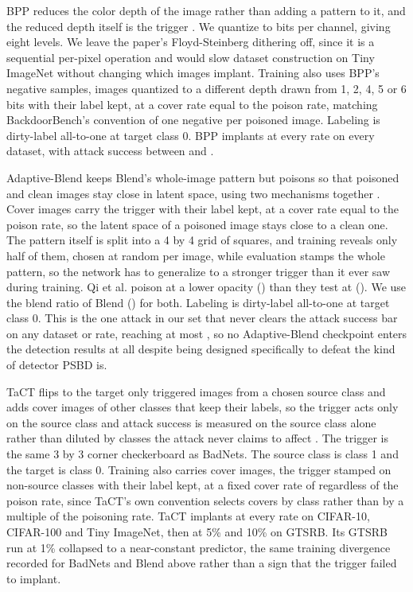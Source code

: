 BPP reduces the color depth of the image rather than adding a pattern to it, and the reduced depth itself is the trigger \cite{wang2022bpp}. We quantize to \AttackBppBitDepth{} bits per channel, giving eight levels. We leave the paper's Floyd-Steinberg dithering off, since it is a sequential per-pixel operation and would slow dataset construction on Tiny ImageNet without changing which images implant. Training also uses BPP's negative samples, images quantized to a different depth drawn from 1, 2, 4, 5 or 6 bits with their label kept, at a cover rate equal to the poison rate, matching BackdoorBench's convention of one negative per poisoned image. Labeling is dirty-label all-to-one at target class 0. BPP implants at every rate on every dataset, with attack success between \AttackBppAsrMin{} and \AttackBppAsrMax{}.

Adaptive-Blend keeps Blend's whole-image pattern but poisons so that poisoned and clean images stay close in latent space, using two mechanisms together \cite{qi2023adaptive}. Cover images carry the trigger with their label kept, at a cover rate equal to the poison rate, so the latent space of a poisoned image stays close to a clean one. The pattern itself is split into a 4 by 4 grid of squares, and training reveals only half of them, chosen at random per image, while evaluation stamps the whole pattern, so the network has to generalize to a stronger trigger than it ever saw during training. Qi et al. poison at a lower opacity () than they test at (). We use the blend ratio of Blend (\AttackAdaptiveBlendAlpha{}) for both. Labeling is dirty-label all-to-one at target class 0. This is the one attack in our set that never clears the attack success bar on any dataset or rate, reaching at most \AttackAdaptiveBlendAsrMax{}, so no Adaptive-Blend checkpoint enters the detection results at all despite being designed specifically to defeat the kind of detector PSBD is.

TaCT flips to the target only triggered images from a chosen source class and adds cover images of other classes that keep their labels, so the trigger acts only on the source class and attack success is measured on the source class alone rather than diluted by classes the attack never claims to affect \cite{tang2021demon}. The trigger is the same 3 by 3 corner checkerboard as BadNets. The source class is class 1 and the target is class 0. Training also carries cover images, the trigger stamped on non-source classes with their label kept, at a fixed cover rate of \AttackTactCoverRate{} regardless of the poison rate, since TaCT's own convention selects covers by class rather than by a multiple of the poisoning rate. TaCT implants at every rate on CIFAR-10, CIFAR-100 and Tiny ImageNet, then at 5\% and 10\% on GTSRB. Its GTSRB run at 1\% collapsed to a near-constant predictor, the same training divergence recorded for BadNets and Blend above rather than a sign that the trigger failed to implant.

